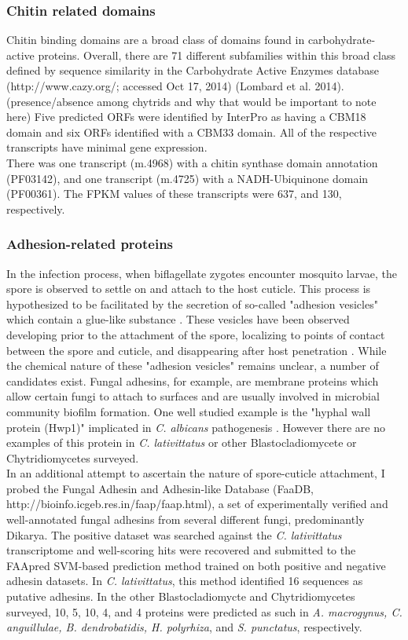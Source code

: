 \subsubsection*{Chitin related domains}
Chitin binding domains are a broad class of domains found in carbohydrate-active proteins. Overall, there are 71 different subfamilies within this broad class defined by sequence similarity in the Carbohydrate Active Enzymes database (http://www.cazy.org/; accessed Oct 17, 2014) (Lombard et al. 2014). (presence/absence among chytrids and why that would be important to note here) Five predicted ORFs were identified by InterPro as having a CBM18 domain and six ORFs identified with a CBM33 domain. All of the respective transcripts have minimal gene expression. \\
\indent There was one transcript (m.4968) with a chitin synthase domain annotation (PF03142), and one transcript (m.4725) with a NADH-Ubiquinone domain (PF00361). The FPKM values of these transcripts were 637, and 130, respectively.
\subsubsection*{Adhesion-related proteins}
In the infection process, when biflagellate zygotes encounter mosquito larvae, the spore is observed to settle on and attach to the host cuticle. This process is hypothesized to be facilitated by the secretion of so-called "adhesion vesicles" which contain a glue-like substance \cite{Travland1979}. These vesicles have been observed developing prior to the attachment of the spore, localizing to points of contact between the spore and cuticle, and disappearing after host penetration \cite{Travland1979}. While the chemical nature of these "adhesion vesicles" remains unclear, a number of candidates exist. Fungal adhesins, for example, are membrane proteins which allow certain fungi to attach to surfaces and are usually involved in microbial community biofilm formation. One well studied example is the "hyphal wall protein (Hwp1)" implicated in \textit{C. albicans} pathogenesis \cite{Staab1999}. However there are no examples of this protein in \textit{C. lativittatus} or other Blastocladiomycete or Chytridiomycetes surveyed.\\ 
\indent In an additional attempt to ascertain the nature of spore-cuticle attachment, I probed the Fungal Adhesin and Adhesin-like Database (FaaDB, http://bioinfo.icgeb.res.in/faap/faap.html), a set of experimentally verified and well-annotated fungal adhesins from several different fungi, predominantly Dikarya. The positive dataset was searched against the \textit{C. lativittatus} transcriptome and well-scoring hits were recovered and submitted to the FAApred SVM-based prediction method trained on both positive and negative adhesin datasets. In \textit{C. lativittatus}, this method identified 16 sequences as putative adhesins. In the other Blastocladiomycte and Chytridiomycetes surveyed, 10, 5, 10, 4, and 4 proteins were predicted as such in \textit{A. macrogynus, C. anguillulae, B. dendrobatidis, H. polyrhiza}, and \textit{S. punctatus}, respectively. 
